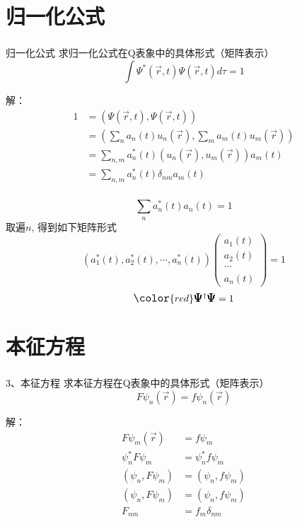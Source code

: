 \section{归一化公式}

\begin{frame} 
    \frametitle{}
    \begin{tcolorbox1}{归一化公式}
        求归一化公式在Q表象中的具体形式（矩阵表示）
        $$ \int \Psi^* (\vec{r},t) \Psi(\vec{r},t) d\tau =1 $$
    \end{tcolorbox1}
    \alert{解：} 
    \begin{equation*}
        \begin{split}
            1 &=(\Psi(\vec{r},t), \Psi(\vec{r},t)) \\
            &= (\sum_n a_n(t) u_n(\vec{r}), \sum_m a_m(t) u_m(\vec{r}))\\
            &= \sum_{n,m} a_n ^*(t) (u_n(\vec{r}), u_m(\vec{r})) a_m(t)\\
            &= \sum_{n,m} a_n ^*(t) \delta_{nm} a_m(t)\\
        \end{split} 
    \end{equation*}
\end{frame}


\begin{frame} 
    $$  \sum_{n} a_n ^*(t) a_n(t) =1 $$
    取遍$n$, 得到如下矩阵形式\\
    $$ (a_1 ^*(t), a_2 ^*(t),\cdots,a_n^*(t) )
    \begin{pmatrix}
        a_1(t)\\
        a_2(t)\\
        \cdots \\
        a_n(t)
    \end{pmatrix}
    =1 $$ \vspace{1.0em} 
    $$ \large \color{red} \pmb {\Psi} ^{\dagger } \pmb {\Psi} =1 $$

\end{frame}

\section{本征方程}

\begin{frame} 
    \frametitle{}
    \begin{tcolorbox1}{3、本征方程}
        求本征方程在Q表象中的具体形式（矩阵表示）
        $$ F\psi_n (\vec{r}) =f \psi_n (\vec{r})$$
    \end{tcolorbox1}
    \alert{解：} 
    \begin{equation*}
        \begin{split}
            F\psi_m (\vec{r}) &=f \psi_m \\
            \psi_n ^*  F\psi_m &=\psi_n ^* f \psi_m\\
            (\psi_n, F\psi_m )&=(\psi_n, f \psi_m)\\
            (\psi_n, F\psi_m )&=(\psi_n, f \psi_m)\\
            F_{nm} &=f_m \delta_{nm}
        \end{split} 
    \end{equation*}
\end{frame}

